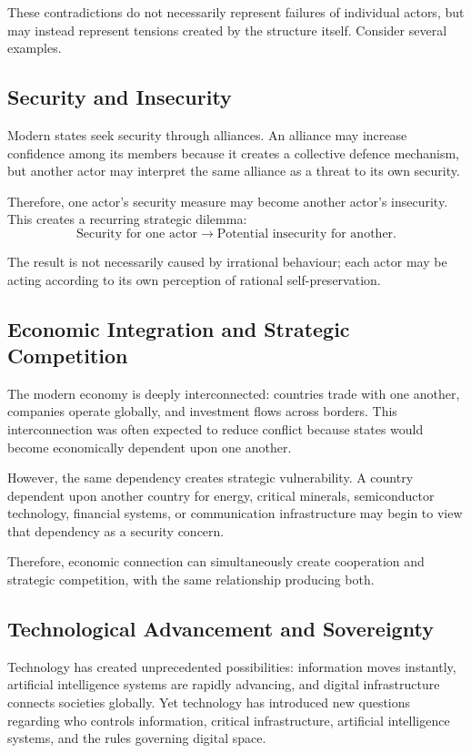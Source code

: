 \documentclass[11pt,openany]{book}
\theoremstyle{plain}
\theoremstyle{definition}
\begin{document}
These contradictions do not necessarily represent failures of individual actors, but may instead represent tensions created by the structure itself. Consider several examples.

\subsection*{Security and Insecurity}

Modern states seek security through alliances. An alliance may increase confidence among its members because it creates a collective defence mechanism, but another actor may interpret the same alliance as a threat to its own security.

Therefore, one actor's security measure may become another actor's insecurity. This creates a recurring strategic dilemma:
\[
\text{Security for one actor}
\longrightarrow
\text{Potential insecurity for another}.
\]

The result is not necessarily caused by irrational behaviour; each actor may be acting according to its own perception of rational self-preservation.

\subsection*{Economic Integration and Strategic Competition}

The modern economy is deeply interconnected: countries trade with one another, companies operate globally, and investment flows across borders. This interconnection was often expected to reduce conflict because states would become economically dependent upon one another.

However, the same dependency creates strategic vulnerability. A country dependent upon another country for energy, critical minerals, semiconductor technology, financial systems, or communication infrastructure may begin to view that dependency as a security concern.

Therefore, economic connection can simultaneously create cooperation and strategic competition, with the same relationship producing both.

\subsection*{Technological Advancement and Sovereignty}

Technology has created unprecedented possibilities: information moves instantly, artificial intelligence systems are rapidly advancing, and digital infrastructure connects societies globally. Yet technology has introduced new questions regarding who controls information, critical infrastructure, artificial intelligence systems, and the rules governing digital space.
\end{document}
